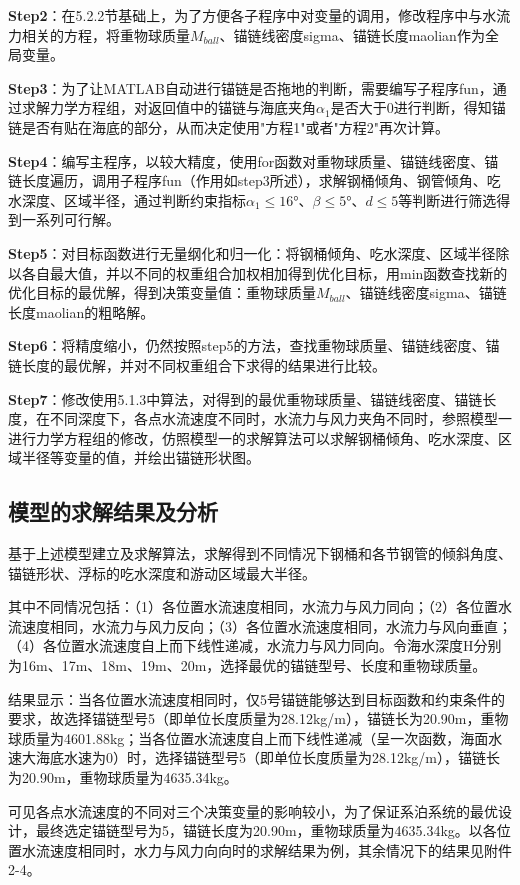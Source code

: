 \documentclass[withoutpreface,bwprint]{cumcmthesis}
\begin{document}
\textbf{Step2}：在5.2.2节基础上，为了方便各子程序中对变量的调用，修改程序中与水流力相关的方程，将重物球质量$M_{ball}$、锚链线密度sigma、锚链长度maolian作为全局变量。

\textbf{Step3}：为了让MATLAB自动进行锚链是否拖地的判断，需要编写子程序fun，通过求解力学方程组，对返回值中的锚链与海底夹角$\alpha_1$是否大于0进行判断，得知锚链是否有贴在海底的部分，从而决定使用"方程1"或者"方程2"再次计算。

\textbf{Step4}：编写主程序，以较大精度，使用for函数对重物球质量、锚链线密度、锚链长度遍历，调用子程序fun（作用如step3所述），求解钢桶倾角、钢管倾角、吃水深度、区域半径，通过判断约束指标$\alpha_1 \leq 16°$、$\beta \leq 5°$、$d \leq 5$等判断进行筛选得到一系列可行解。

\textbf{Step5}：对目标函数进行无量纲化和归一化：将钢桶倾角、吃水深度、区域半径除以各自最大值，并以不同的权重组合加权相加得到优化目标，用min函数查找新的优化目标的最优解，得到决策变量值：重物球质量$M_{ball}$、锚链线密度sigma、锚链长度maolian的粗略解。

\textbf{Step6}：将精度缩小，仍然按照step5的方法，查找重物球质量、锚链线密度、锚链长度的最优解，并对不同权重组合下求得的结果进行比较。

\textbf{Step7}：修改使用5.1.3中算法，对得到的最优重物球质量、锚链线密度、锚链长度，在不同深度下，各点水流速度不同时，水流力与风力夹角不同时，参照模型一进行力学方程组的修改，仿照模型一的求解算法可以求解钢桶倾角、吃水深度、区域半径等变量的值，并绘出锚链形状图。

\subsection{模型的求解结果及分析}
基于上述模型建立及求解算法，求解得到不同情况下钢桶和各节钢管的倾斜角度、锚链形状、浮标的吃水深度和游动区域最大半径。

其中不同情况包括：（1）各位置水流速度相同，水流力与风力同向；（2）各位置水流速度相同，水流力与风力反向；（3）各位置水流速度相同，水流力与风向垂直；（4）各位置水流速度自上而下线性递减，水流力与风力同向。令海水深度H分别为16m、17m、18m、19m、20m，选择最优的锚链型号、长度和重物球质量。

结果显示：当各位置水流速度相同时，仅5号锚链能够达到目标函数和约束条件的要求，故选择锚链型号5（即单位长度质量为28.12kg/m），锚链长为20.90m，重物球质量为4601.88kg；当各位置水流速度自上而下线性递减（呈一次函数，海面水速大海底水速为0）时，选择锚链型号5（即单位长度质量为28.12kg/m），锚链长为20.90m，重物球质量为4635.34kg。

可见各点水流速度的不同对三个决策变量的影响较小，为了保证系泊系统的最优设计，最终选定锚链型号为5，锚链长度为20.90m，重物球质量为4635.34kg。以各位置水流速度相同时，水力与风力向向时的求解结果为例，其余情况下的结果见附件2-4。
\end{document}
